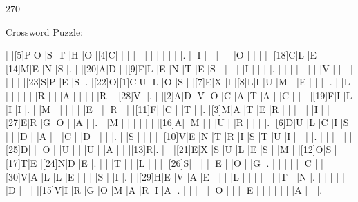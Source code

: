 \documentclass[12pt]{article}
\begin{document}
\pagestyle{fancy}
\fancyhf{}
\renewcommand{\headrulewidth}{0pt}
\renewcommand{\footrulewidth}{0pt}
\libertine
\renewcommand\PuzzleClueFont{\rm\normalsize}
\noindent\begin{rotate}{0}
\small
\end{rotate}
\hfill
\begin{rotate}{270}
\small
\end{rotate}
\begin{center}
  \huge{Crossword Puzzle:}
\end{center}
\vspace{1.5cm}
\begin{Puzzle}{20}{20}
  |{}  |[5]P|O   |S   |T   |H   |O   |[4]C|{}  |{}  |{}  |{}  |{}  |{}  |{}  |{}  |{}  |{}  |{}  |.
  |{}  |I   |{}  |{}  |{}  |{}  |{}  |O   |{}  |{}  |{}  |{}  |[18]C|L   |E   |[14]M|E   |N   |S   |.
  |{}  |[20]A|D   |{}  |[9]F|L   |E   |N   |T   |E   |S   |{}  |{}  |{}  |{}  |I   |{}  |{}  |{}  |.
  |{}  |{}  |{}  |{}  |{}  |{}  |{}  |V   |{}  |{}  |{}  |{}  |{}  |{}  |{}  |[23]S|P   |E   |S   |.
  |[22]O|[1]C|U   |L   |O   |S   |{}  |[7]E|X   |I   |[8]L|I   |U   |M   |{}  |E   |{}  |{}  |{}  |.
  |{}  |L   |{}  |{}  |{}  |{}  |{}  |R   |{}  |{}  |A   |{}  |{}  |{}  |{}  |R   |{}  |[28]V|{}  |.
  |{}  |[2]A|D   |V   |O   |C   |A   |T   |A   |{}  |C   |{}  |{}  |{}  |[19]F|I   |L   |I   |I   |.
  |{}  |M   |{}  |{}  |{}  |{}  |{}  |E   |{}  |{}  |R   |{}  |{}  |[11]F|{}  |C   |{}  |T   |{}  |.
  |[3]M|A   |T   |E   |R   |{}  |{}  |{}  |{}  |{}  |I   |{}  |[27]E|R   |G   |O   |{}  |A   |{}  |.
  |{}  |M   |{}  |{}  |{}  |{}  |{}  |{}  |[16]A|{}  |M   |{}  |{}  |U   |{}  |R   |{}  |{}  |{}  |.
  |[6]D|U   |L   |C   |I   |S   |{}  |{}  |D   |{}  |A   |{}  |{}  |C   |{}  |D   |{}  |{}  |{}  |.
  |{}  |S   |{}  |{}  |{}  |{}  |[10]V|E   |N   |T   |R   |I   |S   |T   |U   |I   |{}  |{}  |{}  |.
  |{}  |{}  |{}  |{}  |{}  |[25]D|{}  |{}  |O   |{}  |U   |{}  |{}  |U   |{}  |A   |{}  |{}  |[13]R|.
  |{}  |{}  |[21]E|X   |S   |U   |L   |E   |S   |{}  |M   |{}  |[12]O|S   |[17]T|E   |[24]N|D   |E   |.
  |{}  |{}  |T   |{}  |{}  |L   |{}  |{}  |{}  |[26]S|{}  |{}  |{}  |{}  |E   |{}  |O   |{}  |G   |.
  |{}  |{}  |{}  |{}  |{}  |C   |{}  |{}  |[30]V|A   |L   |L   |E   |{}  |{}  |{}  |S   |{}  |I   |.
  |{}  |[29]H|E   |V   |A   |E   |{}  |{}  |{}  |L   |{}  |{}  |{}  |{}  |{}  |{}  |T   |{}  |N   |.
  |{}  |{}  |{}  |{}  |{}  |D   |{}  |{}  |{}  |[15]V|I   |R   |G   |O   |M   |A   |R   |I   |A   |.
  |{}  |{}  |{}  |{}  |{}  |O   |{}  |{}  |{}  |E   |{}  |{}  |{}  |{}  |{}  |{}  |A   |{}  |{}  |.
\end{Puzzle}
\end{document}
